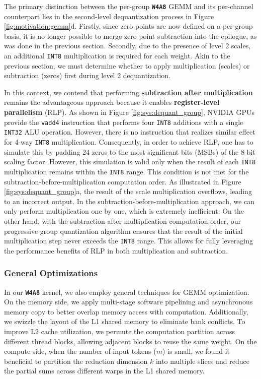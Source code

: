 The primary distinction between the per-group \textbf{\texttt{W4A8}} GEMM and its per-channel counterpart lies in the second-level dequantization process in Figure \ref{fig:motivation:gemm}d. Firstly, since zero points are now defined on a per-group basis, it is no longer possible to merge zero point subtraction into the epilogue, as was done in the previous section. Secondly, due to the presence of level 2 scales, an additional \texttt{INT8} multiplication is required for each weight. Akin to the previous section, we must determine whether to apply multiplication (scales) or subtraction (zeros) first during level 2 dequantization.

In this context, we contend that performing \textbf{subtraction after multiplication} remains the advantageous approach because it enables \textbf{register-level parallelism} (RLP). As shown in Figure \ref{fig:sys:dequant_group}, NVIDIA GPUs provide the \texttt{vadd4} instruction that performs four \texttt{INT8} additions with a single \texttt{INT32} ALU operation. However, there is no instruction that realizes similar effect for 4-way \texttt{INT8} multiplication. Consequently, in order to achieve RLP, one has to simulate this by padding 24 zeros to the most significant bits (MSBs) of the 8-bit scaling factor. However, this simulation is valid only when the result of each \texttt{INT8} multiplication remains within the \texttt{INT8} range. This condition is not met for the subtraction-before-multiplication computation order. As illustrated in Figure \ref{fig:sys:dequant_group}a, the result of the scale multiplication overflows, leading to an incorrect output. In the subtraction-before-multiplication approach, we can only perform multiplication one by one, which is extremely inefficient. On the other hand, with the subtraction-after-multiplication computation order, our progressive group quantization algorithm ensures that the result of the initial multiplication step never exceeds the \texttt{INT8} range. This allows for fully leveraging the performance benefits of RLP in both multiplication and subtraction.


\vspace{-8pt}
\subsubsection{General Optimizations}

In our \textbf{\texttt{W4A8}} kernel, we also employ general techniques for GEMM optimization. On the memory side, we apply multi-stage software pipelining and asynchronous memory copy to better overlap memory access with computation. Additionally, we swizzle the layout of the L1 shared memory to eliminate bank conflicts. To improve L2 cache utilization, we permute the computation partition across different thread blocks, allowing adjacent blocks to reuse the same weight. On the compute side, when the number of input tokens ($m$) is small, we found it beneficial to partition the reduction dimension $k$ into multiple slices and reduce the partial sums across different warps in the L1 shared memory. %

